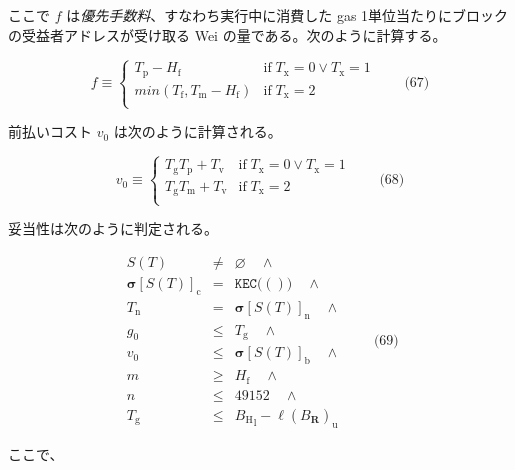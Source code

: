 \documentclass[
]{ltjsarticle}
\begin{document}
\hypertarget{priority_fee_f}{}

ここで \(f\) は\emph{優先手数料}、すなわち実行中に消費した gas
1単位当たりにブロックの受益者アドレスが受け取る Wei
の量である。次のように計算する。

\protect\hypertarget{eq-67}{}{}

\[f \equiv \begin{cases}
  T_{\mathrm{p}} - H_{\mathrm{f}} & \text{if} \; T_{\mathrm{x}} = 0 \lor T_{\mathrm{x}} = 1 \\
  min(T_{\mathrm{f}}, T_{\mathrm{m}} - H_{\mathrm{f}}) & \text{if} \; T_{\mathrm{x}} = 2 \\
  \end{cases} \qquad \text{(67)}\]

前払いコスト \(v_0\) は次のように計算される。

\protect\hypertarget{eq-68}{}{}

\[v_0 \equiv \begin{cases}
  T_{\mathrm{g}}T_{\mathrm{p}} + T_{\mathrm{v}} & \text{if} \; T_{\mathrm{x}} = 0 \lor T_{\mathrm{x}} = 1 \\
  T_{\mathrm{g}}T_{\mathrm{m}} + T_{\mathrm{v}} & \text{if} \; T_{\mathrm{x}} = 2 \\
  \end{cases} \qquad \text{(68)}\]

妥当性は次のように判定される。

\protect\hypertarget{eq-69}{}{}\protect\hypertarget{transaction_nonce}{}{}

\[\begin{array}{rcl}
S(T) & \neq & \varnothing \quad \wedge \\
\boldsymbol{\sigma}[S(T)]_{\mathrm{c}} & = & \texttt{KEC}\big( () \big) \quad \wedge \\
T_{\mathrm{n}} & = & \boldsymbol{\sigma}[S(T)]_{\mathrm{n}} \quad \wedge \\
g_0 & \leqslant & T_{\mathrm{g}} \quad \wedge \\
v_0 & \leqslant & \boldsymbol{\sigma}[S(T)]_{\mathrm{b}} \quad \wedge \\
m & \geqslant & H_{\mathrm{f}} \quad \wedge \\
n & \leqslant & 49152 \quad \wedge \\
T_{\mathrm{g}} & \leqslant & {B_{\mathrm{H}}}_{\mathrm{l}} - \ell(B_{\mathbf{R}})_{\mathrm{u}}
\end{array} \qquad \text{(69)}\]

ここで、
\end{document}
